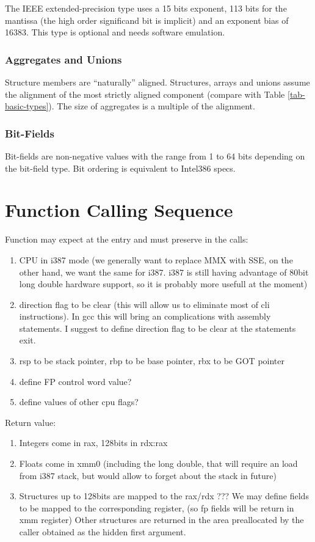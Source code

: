 The IEEE extended-precision type uses a 15 bits exponent, 113 bits for
the mantissa (the high order significand bit is implicit) and an
exponent bias of 16383.  This type is optional and needs software
emulation.

\subsubsection{Aggregates and Unions}

Structure members are "`naturally"' aligned.  Structures, arrays and
unions assume the alignment of the most strictly aligned component
(compare with Table \ref{tab-basic-types}). The size of aggregates is
a multiple of the alignment.


\subsubsection{Bit-Fields}

Bit-fields are non-negative values with the range from 1 to 64 bits
depending on the bit-field type. Bit ordering is equivalent to
Intel386 specs.


\section{Function Calling Sequence}

Function may expect at the entry and must preserve in the calls:
\begin{enumerate}
\item CPU in i387 mode (we generally want to replace MMX with SSE, on the other
      hand, we want the same for i387.  i387 is still having advantage of 80bit
      long double hardware support, so it is probably more usefull at the moment)
\item direction flag to be clear (this will allow us to eliminate most of cli
      instructions).  In gcc this will bring an complications with assembly
      statements.  I suggest to define direction flag to be clear at the
      statements exit.
\item rsp to be stack pointer, rbp to be base pointer, rbx to be GOT pointer
\item define FP control word value?
\item define values of other cpu flags?
\end{enumerate}
Return value:
\begin{enumerate}
\item Integers come in rax, 128bits in rdx:rax
\item Floats come in xmm0 (including the long double, that will require an
      load from i387 stack, but would allow to forget about the stack in future)
\item Structures up to 128bits are mapped to the rax/rdx
      ??? We may define fields to be mapped to the corresponding register,
      (so fp fields will be return in xmm register)
      Other structures are returned in the area preallocated by the caller
      obtained as the hidden first argument.
\end{enumerate}

